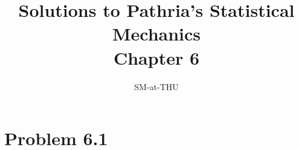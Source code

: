 \documentclass{article}
\author{SM-at-THU}
\title{\bf{Solutions to Pathria's Statistical Mechanics}\\Chapter 6}
\begin{document}
\maketitle
\section*{Problem 6.1}
\end{document}
